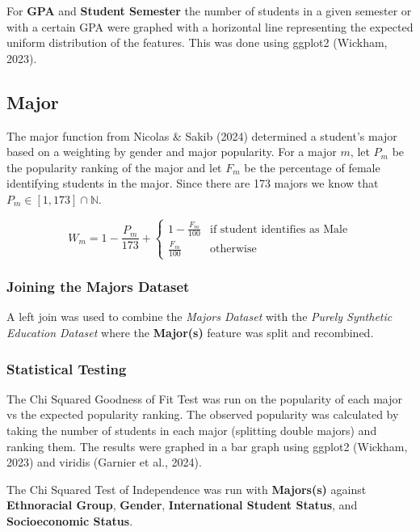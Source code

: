 \documentclass{article}
\begin{document}
For \textbf{GPA} and \textbf{Student Semester} the number of students in a given semester or with a certain GPA were graphed with a horizontal line representing the expected uniform distribution of the features. This was done using ggplot2 (Wickham, 2023).

\subsection{Major}\label{major}

\label{sec:major}

The major function from Nicolas \& Sakib (2024) determined a student's major based on a weighting by gender and major popularity. For a major \(m\), let \(P_m\) be the popularity ranking of the major and let \(F_m\) be the percentage of female identifying students in the major. Since there are 173 majors we know that \(P_m\in[1,173]\cap\mathbb{N}\).

\[
W_m=1-\frac{P_m}{173}+\begin{cases} 
  1-\frac{F_m}{100} & \text{if student identifies as Male} \\
  \frac{F_m}{100} & \text{otherwise}
\end{cases}
\]

\subsubsection{Joining the Majors Dataset}\label{joining-the-majors-dataset}

A left join was used to combine the \emph{Majors Dataset} with the \emph{Purely Synthetic Education Dataset} where the \textbf{Major(s)} feature was split and recombined.

\subsubsection{Statistical Testing}\label{statistical-testing-1}

The Chi Squared Goodness of Fit Test was run on the popularity of each major vs the expected popularity ranking. The observed popularity was calculated by taking the number of students in each major (splitting double majors) and ranking them. The results were graphed in a bar graph using ggplot2 (Wickham, 2023) and viridis (Garnier et al., 2024).

The Chi Squared Test of Independence was run with \textbf{Majors(s)} against \textbf{Ethnoracial Group}, \textbf{Gender}, \textbf{International Student Status}, and \textbf{Socioeconomic Status}.
\end{document}

